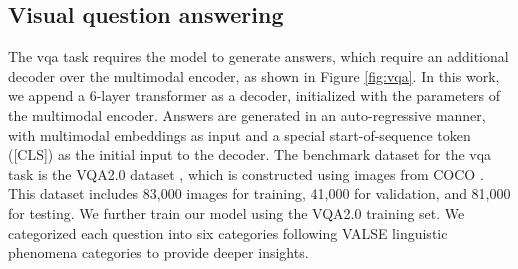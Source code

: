 \subsection{Visual question answering}
The \acrfull{vqa} task requires the model to generate answers, which require an additional decoder over the multimodal encoder, as shown in Figure \ref{fig:vqa}. 
In this work, we append a 6-layer transformer as a decoder, initialized with the parameters of the multimodal encoder. 
Answers are generated in an auto-regressive manner, with multimodal embeddings as input and a special start-of-sequence token ([CLS]) as the initial input to the decoder.
The benchmark dataset for the \acrshort{vqa} task is the VQA2.0 dataset \cite{vqa2}, which is constructed using images from COCO \cite{mscoco}. 
This dataset includes 83,000 images for training, 41,000 for validation, and 81,000 for testing.
We further train our model using the VQA2.0 training set.
We categorized each question into six categories following VALSE linguistic phenomena categories to provide deeper insights.
